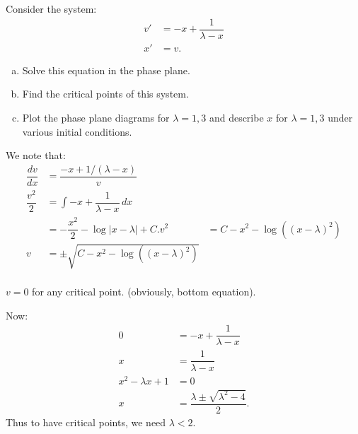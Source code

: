 \documentclass[11pt]{article}
\begin{document}
    \begin{problem}
        \setcounter{equation}{-1} \break
        Consider the system:
        \begin{align}
            v' &= -x+\dfrac{1}{\lambda - x} \\
            x' &= v.
        \end{align}
        \begin{enumerate}[(a)]
            \item Solve this equation in the phase plane.
            \item Find the critical points of this system. 
            \item Plot the phase plane diagrams for $\lambda=1,3$ and describe $x$ for $\lambda = 1,3$ under various initial conditions.
        \end{enumerate}
    \end{problem}
    \begin{solution}
        We note that:
        \begin{align}
            \dfrac{dv}{dx} &= \dfrac{-x+1/(\lambda -x)}{v} \\
            \dfrac{v^2}{2} &= \int -x+\dfrac{1}{\lambda - x} \, dx \\
            &= -\dfrac{x^2}{2}-\log|x-\lambda| + C.
            v^2  &= C-x^2 -\log((x-\lambda)^2) \\
            v &= \pm \sqrt{C-x^2 -\log((x-\lambda)^2)} \\
        \end{align}
    \end{solution}
    \begin{solution} \hfill
        \begin{observation}
            $v=0$ for any critical point. (obviously, bottom equation).
        \end{observation}
        Now:
        \begin{align}
            0 &= -x + \dfrac{1}{\lambda-x} \\
            x &= \dfrac{1}{\lambda - x} \\
            x^2 - \lambda x + 1 &= 0 \\
            x &= \dfrac{\lambda \pm \sqrt{\lambda^2 - 4}}{2}.
        \end{align}
        Thus to have critical points, we need $\lambda < 2$. 
    \end{solution}
\end{document}

